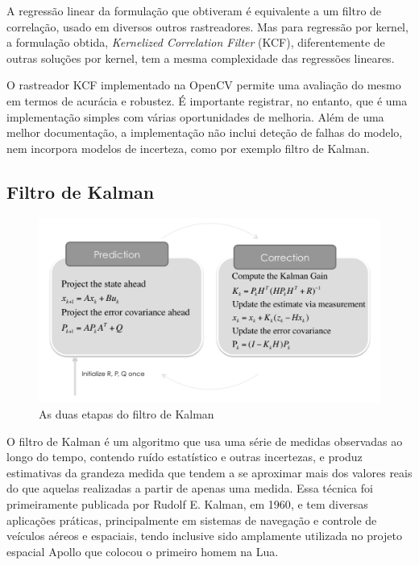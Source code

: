 \documentclass[conference]{IEEEtran}
\begin{document}
A regressão linear da formulação que obtiveram é equivalente a um filtro de correlação, usado em diversos outros rastreadores. Mas para regressão por kernel, a formulação obtida, \textit{Kernelized Correlation Filter} (KCF), diferentemente de outras soluções por kernel, tem a mesma complexidade das regressões lineares\cite{henriques}.

O rastreador KCF implementado na OpenCV\cite{opencv} permite uma avaliação do mesmo em termos de acurácia e robustez. É importante registrar, no entanto, que é uma implementação simples com várias oportunidades de melhoria.  Além de uma melhor documentação, a implementação não inclui deteção de falhas do modelo, nem incorpora modelos de incerteza, como por exemplo filtro de Kalman. \label{kcf-opencv}

\subsection{Filtro de Kalman}
\begin{figure}[ht!]
\begin{center}
\includegraphics[width=\columnwidth]{kalman.png}
\caption{As duas etapas do filtro de Kalman\cite{balzer82}}
\label{etapas-kalman}
\end{center}
\end{figure}

O filtro de Kalman é um algoritmo que usa uma série de medidas observadas ao longo do tempo, contendo ruído estatístico e outras 
incertezas, e produz estimativas da grandeza medida que tendem a se aproximar mais dos valores reais do que aquelas realizadas a partir de apenas uma medida\cite{wikipedia}. Essa técnica foi primeiramente publicada por Rudolf E. Kalman, em 1960\cite{kalman}, e tem diversas aplicações práticas, principalmente em sistemas de navegação e controle de veículos aéreos e espaciais, tendo inclusive sido amplamente utilizada  no projeto espacial Apollo que colocou o primeiro homem na Lua\cite{grewal}.
\end{document}
